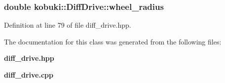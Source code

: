 \subsubsection[{wheel\-\_\-radius}]{\setlength{\rightskip}{0pt plus 5cm}double {\bf kobuki\-::\-Diff\-Drive\-::wheel\-\_\-radius}\hspace{0.3cm}{\ttfamily  [private]}}\label{classkobuki_1_1DiffDrive_a8074f33732a3dd52f6ba2fc00223727d}


\-Definition at line 79 of file diff\-\_\-drive.\-hpp.



\-The documentation for this class was generated from the following files\-:\begin{DoxyCompactItemize}
\item 
{\bf diff\-\_\-drive.\-hpp}\item 
{\bf diff\-\_\-drive.\-cpp}\end{DoxyCompactItemize}
